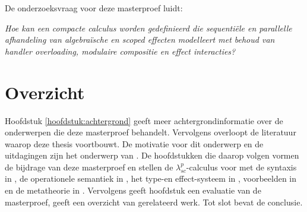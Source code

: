  De onderzoeksvraag voor deze masterproef luidt: \newline

\emph{Hoe kan een compacte calculus worden gedefinieerd die sequentiële en parallelle afhandeling van algebraïsche en scoped effecten modelleert met behoud van handler overloading, modulaire compositie en effect interacties?}

\section{Overzicht}
Hoofdstuk \ref{hoofdstuk:achtergrond} geeft meer achtergrondinformatie over de onderwerpen die deze masterproef behandelt. Vervolgens overloopt  de literatuur waarop deze thesis voortbouwt. De motivatie voor dit onderwerp en de uitdagingen zijn het onderwerp van . De hoofdstukken die daarop volgen vormen de bijdrage van deze masterproef en stellen de $\lambda_{sc}^{p}$-calculus voor met de syntaxis in , de operationele semantiek in , het type-en effect-systeem in , voorbeelden in  en de metatheorie in . Vervolgens geeft hoofdstuk  een evaluatie van de masterproef,  geeft een overzicht van gerelateerd werk. Tot slot bevat  de conclusie.

